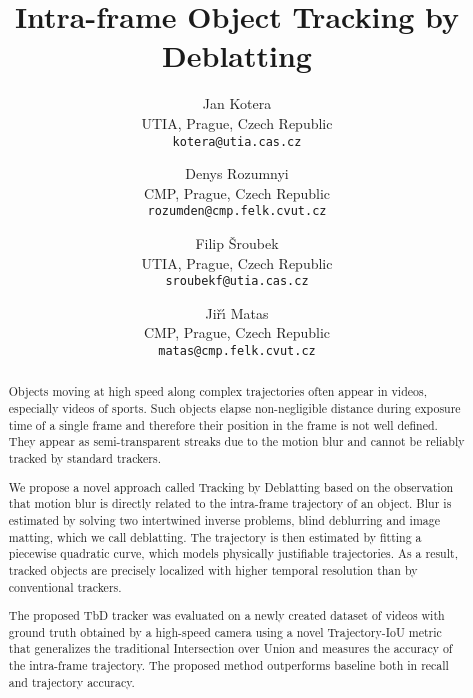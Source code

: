 \documentclass[10pt,twocolumn,letterpaper]{article}
\begin{document}
\title{Intra-frame Object Tracking by Deblatting}

\author{Jan Kotera\\
UTIA, Prague, Czech Republic\\
{\tt\small kotera@utia.cas.cz}
\and
Denys Rozumnyi\\
CMP, Prague, Czech Republic\\
{\tt\small rozumden@cmp.felk.cvut.cz}
\and
Filip \v{S}roubek\\
UTIA, Prague, Czech Republic\\
{\tt\small sroubekf@utia.cas.cz}
\and
Ji\v{r}\'\i{} Matas\\
CMP, Prague, Czech Republic\\
{\tt\small matas@cmp.felk.cvut.cz}
}

\maketitle



\begin{abstract}
Objects moving at high speed along complex trajectories often appear in videos, especially videos of sports. Such objects elapse non-negligible distance during exposure time of a single frame and therefore their position in the frame is not well defined. They appear as semi-transparent streaks due to the motion blur and cannot be reliably tracked by standard trackers.

We propose a novel approach called Tracking by Deblatting based on the observation that motion blur is directly related to the intra-frame trajectory of an object.
Blur is estimated by solving two intertwined inverse problems, blind deblurring and image matting, which we call deblatting. The trajectory is then estimated by fitting a piecewise quadratic curve, which models physically justifiable trajectories. As a result, tracked objects are precisely localized with higher temporal resolution than by conventional trackers.

The proposed TbD tracker was evaluated on a newly created dataset of videos with ground truth obtained by a high-speed camera using a novel Trajectory-IoU metric that generalizes the traditional Intersection over Union and measures the accuracy of the intra-frame trajectory. The proposed method outperforms baseline both in recall and trajectory accuracy.
\end{abstract}
\end{document}
